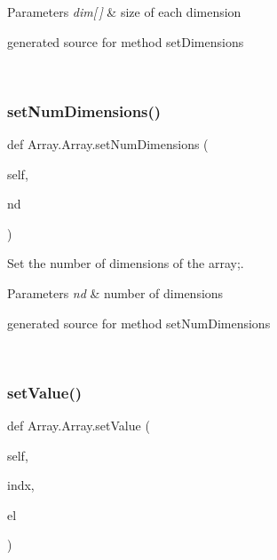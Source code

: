 \begin{DoxyParams}{Parameters}
{\em dim\mbox{[}$\,$\mbox{]}} & size of each dimension\begin{DoxyVerb}generated source for method setDimensions \end{DoxyVerb}
 \\
\hline
\end{DoxyParams}
\hypertarget{class_array_1_1_array_a5ec020721506da4d66ee5ad921d11311}{}\label{class_array_1_1_array_a5ec020721506da4d66ee5ad921d11311} 
\subsubsection{\texorpdfstring{set\+Num\+Dimensions()}{setNumDimensions()}}
{\footnotesize\ttfamily def Array.\+Array.\+set\+Num\+Dimensions (\begin{DoxyParamCaption}\item[{}]{self,  }\item[{}]{nd }\end{DoxyParamCaption})}



Set the number of dimensions of the array;. 


\begin{DoxyParams}{Parameters}
{\em nd} & number of dimensions\begin{DoxyVerb}generated source for method setNumDimensions \end{DoxyVerb}
 \\
\hline
\end{DoxyParams}
\hypertarget{class_array_1_1_array_a51ca2c608ae48eca4edd756dc0cc36ef}{}\label{class_array_1_1_array_a51ca2c608ae48eca4edd756dc0cc36ef} 
\subsubsection{\texorpdfstring{set\+Value()}{setValue()}}
{\footnotesize\ttfamily def Array.\+Array.\+set\+Value (\begin{DoxyParamCaption}\item[{}]{self,  }\item[{}]{indx,  }\item[{}]{el }\end{DoxyParamCaption})}



